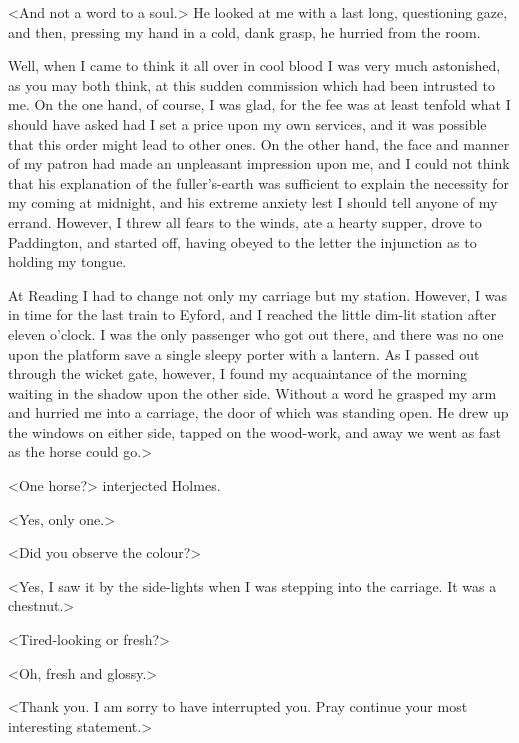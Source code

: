 <And not a word to a soul.> He looked at me with a last long, questioning gaze, and then, pressing my hand in a cold, dank grasp, he hurried from the room.

Well, when I came to think it all over in cool blood I was very much astonished, as you may both think, at this sudden commission which had been intrusted to me. On the one hand, of course, I was glad, for the fee was at least tenfold what I should have asked had I set a price upon my own services, and it was possible that this order might lead to other ones. On the other hand, the face and manner of my patron had made an unpleasant impression upon me, and I could not think that his explanation of the fuller's-earth was sufficient to explain the necessity for my coming at midnight, and his extreme anxiety lest I should tell anyone of my errand. However, I threw all fears to the winds, ate a hearty supper, drove to Paddington, and started off, having obeyed to the letter the injunction as to holding my tongue.

At Reading I had to change not only my carriage but my station. However, I was in time for the last train to Eyford, and I reached the little dim-lit station after eleven o'clock. I was the only passenger who got out there, and there was no one upon the platform save a single sleepy porter with a lantern. As I passed out through the wicket gate, however, I found my acquaintance of the morning waiting in the shadow upon the other side. Without a word he grasped my arm and hurried me into a carriage, the door of which was standing open. He drew up the windows on either side, tapped on the wood-work, and away we went as fast as the horse could go.>

<One horse?> interjected Holmes.

<Yes, only one.>

<Did you observe the colour?>

<Yes, I saw it by the side-lights when I was stepping into the carriage. It was a chestnut.>

<Tired-looking or fresh?>

<Oh, fresh and glossy.>

<Thank you. I am sorry to have interrupted you. Pray continue your most interesting statement.>

